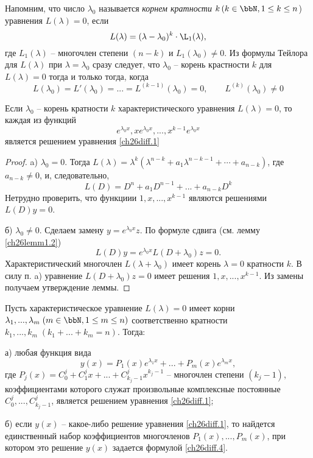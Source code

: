 Напомним, что число $\lambda_0$ называется \textit{корнем кратности} $k\,(k\in\bbN, 1\leq k \leq n$) уравнения $L(\lambda)=0$, если
$$
L(\lambda)=(\lambda-\lambda_0)^k\cdot\L_1(\lambda),
$$
где $L_1(\lambda)$ -- многочлен степени $(n-k)$ и $L_1(\lambda_0)\neq 0$. Из формулы Тейлора для $L(\lambda)$ при $\lambda=\lambda_0$ сразу следует, что  $\lambda_0$ -- корень крастности $k$ для $L(\lambda)=0$ тогда и только тогда, когда
$$
L(\lambda_0)=L'(\lambda_0)=...=L^{(k-1)}(\lambda_0)=0, \qquad L^{(k)}(\lambda_0)\neq 0
$$




\begin{lemm} \label{ch26lemm2.3}
Если $\lambda_0$ -- корень кратности $k$ характеристического уравнения $L(\lambda)=0$, то каждая из функций 
$$
e^{\lambda_0 x},xe^{\lambda_0 x},...,x^{k-1}e^{\lambda_0 x}
$$
является решением уравнения \eqref{ch26diff.1}
\end{lemm}

\begin{proof}

a) $\lambda_0=0$. Тогда $L(\lambda)=\lambda^k(\lambda^{n-k}+a_1\lambda^{n-k-1}+\cdots+a_{n-k})$, где  $a_{n-k}\neq 0$, и, следовательно,
$$
L(D)=D^n+a_1D^{n-1}+...+a_{n-k}D^k
$$
Нетрудно проверить, что функциии $1,x,...,x^{k-1}$ являются решениями $L(D)y=0$.

б) $\lambda_0\neq 0$. Сделаем замену $y=e^{\lambda_0x}z$. По формуле сдвига (см. лемму \ref{ch26lemm1.2})
$$
L(D)y=e^{\lambda_0x}L(D+\lambda_0)z=0.
$$
Характеристический многочлен $L(\lambda+\lambda_0)$ имеет корень $\lambda=0$ кратности $k$. В силу п. a) уравнение $L(D+\lambda_0)z=0$ имеет решения $1,x,...,x^{k-1}$. Из замены получаем утверждение леммы.
\end{proof}


\begin{thm} \label{ch26thm1}
Пусть характеристическое уравнение $L(\lambda)=0$ имеет корни $\lambda_1,...,\lambda_m\;(m\in \bbN, 1\leq m\leq n)$ соответственно кратности $k_1,...,k_m\;(k_1+...+k_m=n).$ Тогда:

а) любая функция вида
\begin{equation} \label{ch26diff.4}
y(x)=P_1(x)e^{\lambda_1x}+...+P_m(x)e^{{\lambda_m}x},
\end{equation}
где $P_j(x)=C_0^j+C_1^jx+...+C_{k_j-1}^jx^{k_j-1}$ -- многочлен степени $(k_j-1)$, коэффициентами которого служат произвольные комплексные постоянные  $C_0^j,...,C_{k_j-1}^j$, является решением уравнения \eqref{ch26diff.1};

б) если $y(x)$ -- какое-либо решение уравнения \eqref{ch26diff.1}, то найдется единственный набор коэффициентов многочленов $P_1(x),...,P_m(x)$, при котором это решение $y(x)$ задается формулой \eqref{ch26diff.4}.
\end{thm}

